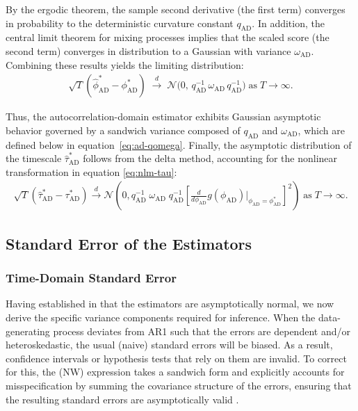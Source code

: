 \documentclass[9pt]{article}
\newcommand{\phiad}{\phi_{\scriptscriptstyle\text{AD}}}
\newcommand{\hatphiad}{\hat{\phi}^*_{\scriptscriptstyle\text{AD}}}
\newcommand{\tauad}{\tau_{\scriptscriptstyle\text{AD}}}
\newcommand{\hattauad}{\hat{\tau}^*_{\scriptscriptstyle\text{AD}}}
\newcommand{\qad}{q_{\scriptscriptstyle\text{AD}}}
\newcommand{\omegaad}{\omega_{\scriptscriptstyle\text{AD}}}
\begin{document}
\noindent By the ergodic theorem, the sample second derivative (the first term) converges in probability to the deterministic curvature constant $\qad$. In addition, the central limit theorem for mixing processes \citep[Theorem~14.33]{hansen_econometrics_2022} implies that the scaled score (the second term) converges in distribution to a Gaussian with variance $\omegaad$. Combining these results yields the limiting distribution:
\begin{align}
    \sqrt{T}(\hatphiad - \phiad^*) \;\overset{d}{\to}\; \mathcal{N}\big(0,\, \qad^{-1}\,\omegaad\,\qad^{-1}\big)\;\text{as}\;T\to\infty.
\end{align}

\noindent Thus, the autocorrelation-domain estimator exhibits Gaussian asymptotic behavior governed by a sandwich variance composed of $\qad$ and $\omegaad$, which are defined below in equation~\eqref{eq:ad-qomega}. Finally, the asymptotic distribution of the timescale $\hattauad$ follows from the delta method, accounting for the nonlinear transformation in equation \eqref{eq:nlm-tau}:
\begin{align}
    \sqrt{T}(\hattauad - \tauad^*) \overset{d}{\to} \mathcal{N}\left(0, \qad^{-1}\; \omegaad \; \qad^{-1} \left[\frac{d}{d\phiad} g(\phiad)\bigg|_{\phiad=\phiad^*}\right]^2\right)\;\text{as}\;T\to\infty.
\end{align}

\subsection{Standard Error of the Estimators}\label{sec:stderr}
\subsubsection{Time-Domain Standard Error}\label{sec:stderr-time-domain}
Having established in  that the estimators are asymptotically normal, we now derive the specific variance components required for inference. When the data-generating process deviates from AR1 such that the errors are dependent and/or heteroskedastic, the usual (naive) standard errors will be biased. As a result, confidence intervals or hypothesis tests that rely on them are invalid. To correct for this, the \citet{newey_simple_1987} (NW) expression takes a sandwich form and explicitly accounts for misspecification by summing the covariance structure of the errors, ensuring that the resulting standard errors are asymptotically valid \citep[Theorem 14.32]{hansen_econometrics_2022}.\\
\end{document}
